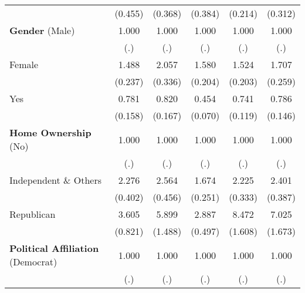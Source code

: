 \begin{table}[htbp]
\begin{tabular}{l*{5}{c}}
                    &     (0.455)         &     (0.368)         &     (0.384)         &     (0.214)         &     (0.312)         \\
\textbf{Gender} (Male)&       1.000         &       1.000         &       1.000         &       1.000         &       1.000         \\
                    &         (.)         &         (.)         &         (.)         &         (.)         &         (.)         \\
Female              &       1.488\sym{**} &       2.057\sym{***}&       1.580\sym{***}&       1.524\sym{***}&       1.707\sym{***}\\
                    &     (0.237)         &     (0.336)         &     (0.204)         &     (0.203)         &     (0.259)         \\
Yes                 &       0.781         &       0.820         &       0.454\sym{***}&       0.741\sym{*}  &       0.786         \\
                    &     (0.158)         &     (0.167)         &     (0.070)         &     (0.119)         &     (0.146)         \\
\textbf{Home Ownership} (No)&       1.000         &       1.000         &       1.000         &       1.000         &       1.000         \\
                    &         (.)         &         (.)         &         (.)         &         (.)         &         (.)         \\
Independent \& Others&       2.276\sym{***}&       2.564\sym{***}&       1.674\sym{***}&       2.225\sym{***}&       2.401\sym{***}\\
                    &     (0.402)         &     (0.456)         &     (0.251)         &     (0.333)         &     (0.387)         \\
Republican          &       3.605\sym{***}&       5.899\sym{***}&       2.887\sym{***}&       8.472\sym{***}&       7.025\sym{***}\\
                    &     (0.821)         &     (1.488)         &     (0.497)         &     (1.608)         &     (1.673)         \\
\textbf{Political Affiliation} (Democrat)&       1.000         &       1.000         &       1.000         &       1.000         &       1.000         \\
                    &         (.)         &         (.)         &         (.)         &         (.)         &         (.)         \\

\end{tabular}
\end{table}
